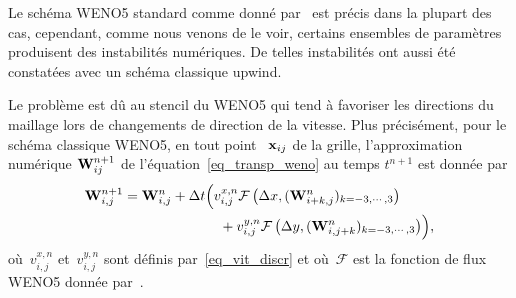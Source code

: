 \documentclass[main.tex]{subfiles}
\begin{document}


Le schéma WENO5 standard comme donné par~\cite{Liu1994} est précis dans la plupart des cas, cependant, comme nous venons de le voir, certains ensembles de paramètres %
 produisent des instabilités numériques. De telles instabilités ont aussi été constatées avec un schéma classique upwind. 

Le problème est dû au stencil du WENO5 qui tend à favoriser les directions du maillage lors de changements de direction de la vitesse. 
Plus précisément, pour le schéma classique WENO5, en tout point 
~$\mathbf{x}_{ij}$ de la grille, l'approximation numérique 
${\bf W}^{n+1}_{ij}$ de l'équation~\eqref{eq_transp_weno} au temps 
$t^{n+1}$ est donnée par
\begin{equation}\label{eq:WENO5}
\begin{aligned}
{\bf W}^{n+1}_{i,j}={\bf W}^n_{i,j} + \Delta t & \Bigl(v_{i,j}^{x,n}
\mathcal{F}\left(\Delta x,({\bf W}^n_{i+k,j})_{k=-3,\cdots, 3}\right) \\
&\quad +v_{i,j}^{y,n} \mathcal{F}\left(\Delta y,({\bf W}^n_{i,j+k})_{k=-3,\cdots, 3}\right)\Bigr),
\end{aligned}
\end{equation}
où~$v_{i,j}^{x,n} $ et~$v_{i,j}^{y,n}$ sont définis par~\eqref{eq_vit_discr} et où~$\mathcal{F}$ est la fonction de flux WENO5 donnée par~\cite{Liu1994}. 
\end{document}
